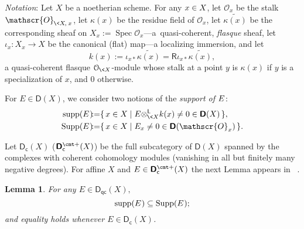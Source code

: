 \documentclass{compositio}
\theoremstyle{plain}
\newtheorem{lem}[thm]{Lemma}
\theoremstyle{definition}
\theoremstyle{remark}
\numberwithin{equation}{thm}
\begin{document}
\pagebreak[3]
 \emph{Notation}: Let $X$ be a noetherian scheme. For any $x\in X{\mkern-1mu}$,{\vspace{1pt}} 
 let ${\mathscr{O}}_x$ be the stalk ${\mathscr{O}}_{{\mkern-1mu}\<X{\mkern-1mu}{\mkern-1mu},\>x{\mkern1mu}}$,{}  let $\kappa(x)$ be the residue field of 
${\mathscr{O}}_x$, let $\widetilde{\kappa(x)}$ be the corresponding sheaf  on $X_x{\!:=}\operatorname{Spec} {\mathscr{O}}_x$---a~quasi-coherent, \emph{flasque} sheaf, {} let $\iota_x\colon X_x\to X$ be the canonical (flat) map---a localizing immersion,{\vspace{1pt}} and let 
\[
k(x){\!:=} \iota_{x*}\widetilde{\kappa(x)}={\mathsf R}\iota_{x*}\widetilde{\kappa(x)},
\]
a quasi-coherent flasque ${\mathcal O_{{\mkern-1mu}\<X}}$-module whose stalk at a point $y$ is $\kappa(x)$ if $y$ is a specialization of $x$, and 0 otherwise.{\vspace{1pt}} 

For $E\in{\boldsymbol{\mathsf{D}}}(X)$, we consider two notions of the \emph{support of} $E{\mkern1mu}$: 
\begin{align*}
\operatorname{supp}(E{\mkern1mu})&{\!:=}\{\,x\in X\mid E{\otimes^{\mathsf L}_{{{\mkern-1mu}\<X}}} k(x)\ne 0\in{\boldsymbol{\mathsf{D}}}(X)\,\},\\
\operatorname{Supp}(E{\mkern1mu})&{\!:=}\{\,x\in X\mid E_x\ne 0\in{\boldsymbol{\mathsf{D}}}({\mathscr{O}}_x)\,\}.
\end{align*}

Let ${\boldsymbol{\mathsf{D}}}_{\mathsf{c}}(X)$ (${{\boldsymbol{\mathsf{D}}}_{\mathsf{c}}^{{\vbox to 0pt{\vskip-.95 ex\hbox{$\scriptstyle \text{\cmt\char'053}$}\vss}}}}(X)$) be the full subcategory of ${\boldsymbol{\mathsf{D}}}(X)$ spanned by the complexes with coherent cohomology modules (vanishing in all but finitely many negative degrees). For affine $X$ and $E\in{{\boldsymbol{\mathsf{D}}}_{\mathsf{c}}^{{\vbox to 0pt{\vskip-.95 ex\hbox{$\scriptstyle \text{\cmt\char'053}$}\vss}}}}(X)$ the next Lemma appears in ~\cite[top of page 158]{Fx}.  
\begin{lem}
\label{Supp} 
For any\/ $E\in{{\boldsymbol{\mathsf{D}}}_{\mathsf{qc}}}(X),$  
\[
\operatorname{supp}(E{\mkern1mu})\subseteq\operatorname{Supp}(E{\mkern1mu});
\]  
and equality holds whenever $E\in{\boldsymbol{\mathsf{D}}}_{\mathsf{c}}(X)$. 
\end{lem}
\end{document}
